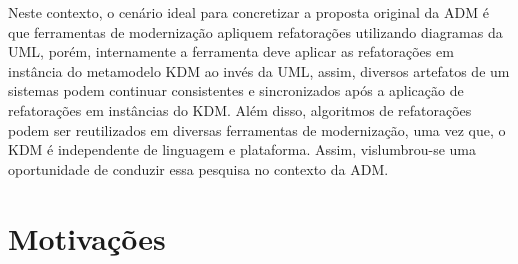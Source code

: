 %
%


Neste contexto, o cenário ideal para concretizar a proposta original da ADM é que ferramentas de modernização apliquem refatorações utilizando diagramas da UML, porém, internamente a ferramenta deve aplicar as refatorações em instância do metamodelo KDM ao invés da UML, assim, diversos artefatos de um sistemas podem continuar consistentes e sincronizados após a aplicação de refatorações em instâncias do KDM. Além disso, algoritmos de refatorações podem ser reutilizados em diversas ferramentas de modernização, uma vez que, o KDM é independente de linguagem e plataforma. Assim, vislumbrou-se uma oportunidade de conduzir essa pesquisa no contexto da ADM. 







\section{Motivações}\label{sec:justificativa_e_motivacao}


